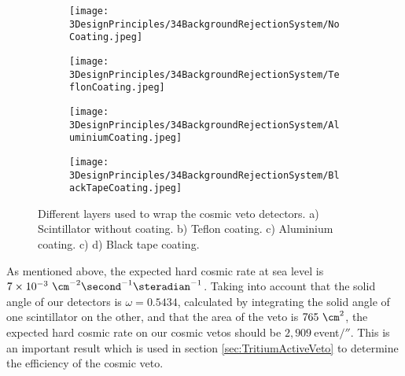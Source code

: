 \begin{figure}[h]
\centering
    \begin{subfigure}[b]{0.23\textwidth}
    \centering
    \texttt{[image: 3DesignPrinciples/34BackgroundRejectionSystem/NoCoating.jpeg]}  
    \caption{\label{subfig:PlasticScintillatorNoCoating}}
    \end{subfigure}
    \hfill
    \begin{subfigure}[b]{0.23\textwidth}
    \centering
    \texttt{[image: 3DesignPrinciples/34BackgroundRejectionSystem/TeflonCoating.jpeg]}  
    \caption{\label{subfig:PlasticScintillatorTeflon}}
    \end{subfigure}
    \hfill
    \begin{subfigure}[b]{0.23\textwidth}
    \centering
    \texttt{[image: 3DesignPrinciples/34BackgroundRejectionSystem/AluminiumCoating.jpeg]}  
    \caption{\label{subfig:PlasticScintillatorAluminium}}
    \end{subfigure}
    \hfill
    \begin{subfigure}[b]{0.23\textwidth}
    \centering
    \texttt{[image: 3DesignPrinciples/34BackgroundRejectionSystem/BlackTapeCoating.jpeg]}  
    \caption{\label{subfig:PlasticScintillatorBlackTape}}
    \end{subfigure}
 \caption{Different layers used to wrap the cosmic veto detectors. a) Scintillator without coating. b) Teflon coating. c) Aluminium coating. c) d) Black tape coating.}
 \label{fig:LayersVeto}
\end{figure}

As mentioned above, the expected hard cosmic rate at sea level is $7 \times 10^{-3}~\cm^{-2}\second^{-1}\steradian^{-1}$. Taking into account that the solid angle of our detectors is $\omega=0.5434$, calculated by integrating the solid angle of one scintillator on the other, and that the area of the veto is $765~\cm^2$, the expected hard cosmic rate on our cosmic vetos should be $2,909~$event$/\second$. This is an important result which is used in section \ref{sec:TritiumActiveVeto} to determine the efficiency of the cosmic veto.